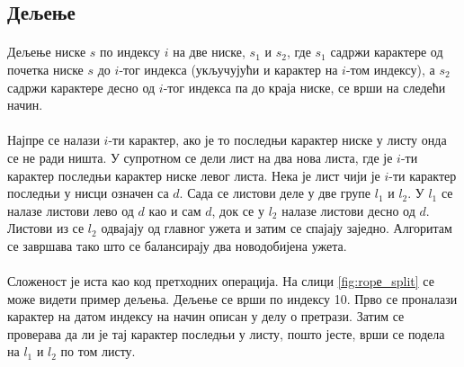 \documentclass[12pt,oneside]{memoir}
\begin{document}
\subsection{Дељење}
\paragraph{}
Дељење ниске \(s\) по индексу \(i\) на две ниске, \(s_1\) и \(s_2\),
где \(s_1\) садржи карактере од почетка ниске \(s\) до \(i\)-тог индекса (укључујући и карактер на 
\(i\)-том индексу), а \(s_2\) садржи карактере десно од \(i\)-тог индекса па до краја ниске,
се врши на следећи начин.

\paragraph{}
Најпре се налази \(i\)-ти карактер, ако је то последњи карактер ниске у листу онда се не ради ништа.
У супротном се дели лист на два нова листа, где је \(i\)-ти карактер последњи карактер ниске
левог листа. Нека је лист чији је \(i\)-ти карактер последњи у нисци означен са \(d\). Сада
се листови деле у две групе \(l_1\) и \(l_2\). У \(l_1\) се налазе листови лево од \(d\) као и сам \(d\), док се у \(l_2\) налазе листови десно од \(d\). Листови из се \(l_2\) одвајају од 
главног ужета и затим се спајају заједно. Алгоритам се завршава тако што се балансирају 
два новодобијена ужета.

\paragraph{} 
Сложеност је иста као код претходних операција. На слици \ref{fig:ropе_split} се може видети пример
дељења. Дељење се врши по индексу 10. Прво се проналази карактер на датом индексу на начин описан
у делу о претрази. Затим се проверава да ли је тај карактер последњи у листу, пошто јесте,
врши се подела на \(l_1\) и \(l_2\) по том листу.
\end{document}
